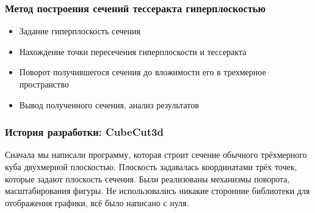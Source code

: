 \documentclass[10pt,pdf,hyperref={unicode}]{beamer}
\begin{document}
\begin{frame}
\frametitle{Метод построения сечений тессеракта гиперплоскостью}
	\begin{itemize}
		\item Задание гиперплоскость сечения
		\item Нахождение точки пересечения гиперплоскости и тессеракта
		\item Поворот получившегося сечения до вложимости его в трехмерное пространство
		\item Вывод полученного сечения, анализ результатов
	\end{itemize}
\end{frame}

\begin{frame}
\frametitle{История разработки: {\bf CubeCut3d}}
	Сначала мы написали программу, которая 
	строит сечение обычного трёхмерного куба двухмерной плоскостью.
	Плоскость задавалась координатами трёх точек, которые задают плоскость сечения.
	Были реализованы механизмы поворота, масштабирования фигуры.	
	Не использовались никакие сторонние библиотеки для отображения графики,
	всё было написано с нуля. 
\end{frame}
\end{document}

